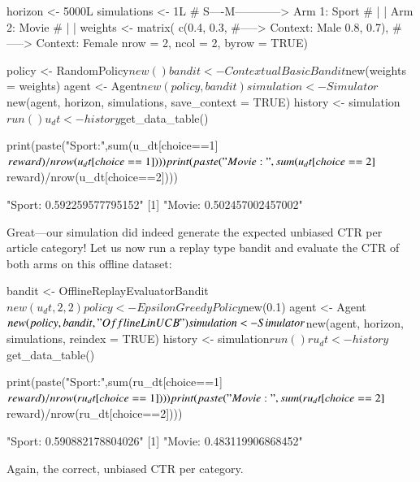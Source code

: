 \documentclass{jss}
\begin{document}
\begin{CodeChunk}
\begin{CodeInput}
horizon     <- 5000L
simulations <- 1L
#                     S----M------------> Arm 1:   Sport
#                     |    |              Arm 2:   Movie
#                     |    |
weights <- matrix( c(0.4, 0.3,    #-----> Context: Male
                     0.8, 0.7),   #-----> Context: Female
                     nrow = 2, ncol = 2, byrow = TRUE)

policy      <- RandomPolicy$new()
bandit      <- ContextualBasicBandit$new(weights = weights)
agent       <- Agent$new(policy, bandit)
simulation  <- Simulator$new(agent, horizon, simulations, save_context = TRUE)
history     <- simulation$run()
u_dt        <- history$get_data_table()

print(paste("Sport:",sum(u_dt[choice==1]$reward)/nrow(u_dt[choice==1])))
print(paste("Movie:",sum(u_dt[choice==2]$reward)/nrow(u_dt[choice==2])))
\end{CodeInput}
\begin{CodeOutput}
[1] "Sport: 0.592259577795152"
[1] "Movie: 0.502457002457002"
\end{CodeOutput}
\end{CodeChunk}

Great---our simulation did indeed generate the expected unbiased CTR per article category! Let us now run a replay type bandit and evaluate the CTR of both arms on this offline dataset:

\begin{CodeChunk}
\begin{CodeInput}
bandit             <- OfflineReplayEvaluatorBandit$new(u_dt,2,2)
policy             <- EpsilonGreedyPolicy$new(0.1)
agent              <- Agent$new(policy, bandit, "OfflineLinUCB")
simulation         <- Simulator$new(agent, horizon, simulations, reindex = TRUE)
history            <- simulation$run()
ru_dt              <- history$get_data_table()

print(paste("Sport:",sum(ru_dt[choice==1]$reward)/nrow(ru_dt[choice==1])))
print(paste("Movie:",sum(ru_dt[choice==2]$reward)/nrow(ru_dt[choice==2])))
\end{CodeInput}
\begin{CodeOutput}
[1] "Sport: 0.590882178804026"
[1] "Movie: 0.483119906868452"
\end{CodeOutput}
\end{CodeChunk}

Again, the correct, unbiased CTR per category.
\end{document}
